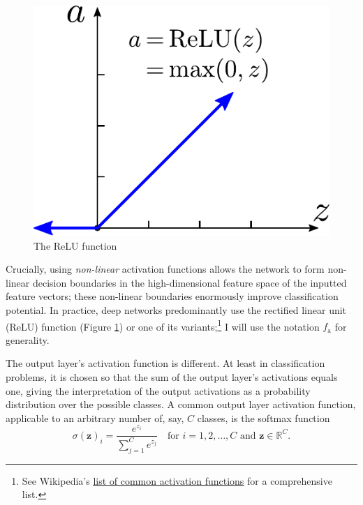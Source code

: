 \documentclass[11pt, a4paper]{article}
\renewcommand{\vec}[1]{\bm{#1}}
\begin{document}
\begin{figure}
    \centering
    \includegraphics[width=\linewidth]{vector/relu.pdf}
    \caption{The ReLU function}
    \label{fig:relu}
\end{figure}
Crucially, using \textit{non-linear} activation functions allows the network to form non-linear decision boundaries in the high-dimensional feature space of the inputted feature vectors; these non-linear boundaries enormously improve classification potential. In practice, deep networks predominantly use the rectified linear unit (ReLU) function (Figure \ref{fig:relu}) or one of its variants;\footnote{See Wikipedia's \href{https://en.wikipedia.org/wiki/Activation_function\#Comparison_of_activation_functions}{\underline{list of common activation functions}} for a comprehensive list.} I will use the notation $ f_{\text{a}} $ for generality.

The output layer's activation function is different. At least in classification problems, it is chosen so that the sum of the output layer's activations equals one, giving the interpretation of the output activations as a probability distribution over the possible classes. A common output layer activation function, applicable to an arbitrary number of, say, $ C $ classes, is the softmax function
\begin{equation}
    \sigma (\vec{z})_{i} = \frac{e^{z_{i}}}{\sum_{j = 1}^{C}e^{z_{j}}} \quad \text{for } i = 1, 2, \ldots, C \text{ and } \vec{z} \in \mathbb{R}^{C}. \label{eq:softmax}
\end{equation}
\end{document}
